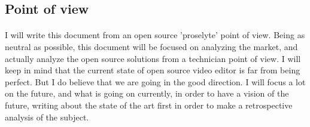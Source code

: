 \subsection{Point of view}
  \paragraph{}
    I will write this document from an open source 'proselyte' point of
    view. Being as neutral as possible, this document will be focused on
    analyzing the market, and actually analyze the open source solutions from
    a technician point of view. I will keep in mind that the current state
    of open source video editor is far from being perfect. But I do believe
    that we are going in the good direction. I will focus a lot on the future,
    and what is going on currently, in order to have a vision of the future,
    writing about the state of the art first in order to make a retrospective 
    analysis of the subject.

